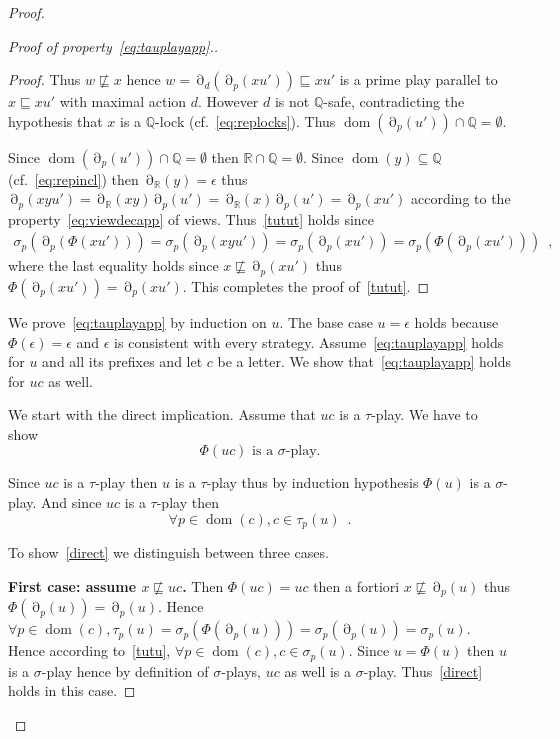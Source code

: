 \documentclass[a4paper,UKenglish]{lipics-v2016}
\newcommand{\QQ}{\mathbb{Q}}
\newcommand{\RR}{\mathbb{R}}
\newcommand{\pref}{\sqsubseteq}
\DeclareMathOperator{\dom}{dom}
\DeclareMathOperator{\view}{\partial}
\begin{document}
\begin{proof}
\begin{proof}[Proof of property~\eqref{eq:tauplayapp}.]
\begin{proof}
Thus $w \not\pref x$ hence 
$w =\view_d(\view_p(xu'))\pref xu'$ is a prime play parallel to $x\pref xu'$
with maximal action $d$.
However $d$ is not $\QQ$-safe,
contradicting the hypothesis that $x$ is a $\QQ$-lock (cf.~\eqref{eq:replocks}).
Thus $\dom(\view_p(u'))\cap \QQ =\emptyset$.

Since
$\dom(\view_p(u'))\cap \QQ =\emptyset$
then $\RR \cap \QQ=\emptyset$.
Since $\dom(y)\subseteq \QQ$ (cf.~\eqref{eq:repincl})
then $\view_\RR(y)=\epsilon$ thus
$\view_p(xyu')=\view_\RR(xy)\view_p(u')=\view_\RR(x)\view_p(u')=\view_p(xu')$
according to the property~\eqref{eq:viewdecapp}
of views.
Thus~\eqref{tutut} holds since
\begin{align*}
\sigma_p(\view_p(\Phi(xu')))
=
\sigma_p(\view_p(xyu'))
=
\sigma_p(\view_p(xu'))
=
\sigma_p(\Phi(\view_p(xu')))
\enspace,
\end{align*}
where the last equality holds since
$x\not\pref \view_p(xu')$
thus $\Phi(\view_p(xu'))=\view_p(xu')$.
This completes the proof of~\eqref{tutut}.
\end{proof}

\medskip

We prove~\eqref{eq:tauplayapp}
by induction on $u$.
The base case $u=\epsilon$ holds because $\Phi(\epsilon)=\epsilon$
and $\epsilon$ is consistent with every strategy.
Assume~\eqref{eq:tauplayapp} holds for $u$ and all its prefixes and let
$c$ be a letter. We show that~\eqref{eq:tauplayapp} holds for $uc$ as well.

\medskip

We start with the direct implication.
Assume that $uc$ is a $\tau$-play.
We have to show
\begin{equation}
\label{direct}
\text{$\Phi(uc)$ is a $\sigma$-play}.
\end{equation}

Since $uc$ is a $\tau$-play then $u$ is a $\tau$-play thus by induction hypothesis
$\Phi(u)$ is a $\sigma$-play.
And since $uc$ is a $\tau$-play then
\begin{equation}
\label{tutu}
\forall p \in\dom(c), c \in \tau_p(u)\enspace.
\end{equation}

To show~\eqref{direct} we distinguish between three cases.

{\bf First case: assume $x\not \pref uc$.} Then $\Phi(uc)=uc$
then a fortiori $x \not\pref  \view_p(u)$
thus $\Phi(\view_p(u))=\view_p(u)$.
Hence $\forall p \in\dom(c), \tau_p(u)=\sigma_p(\Phi(\view_p(u)))=\sigma_p(\view_p(u))=
\sigma_p(u)$.
Hence according to~\eqref{tutu},
$\forall p \in\dom(c), c \in\sigma_p(u)$.
Since $u=\Phi(u)$ then $u$ is a $\sigma$-play hence by definition
of $\sigma$-plays, $uc$ as well is a $\sigma$-play.
Thus~\eqref{direct} holds in this case.


\end{proof}
\end{proof}
\end{document}
